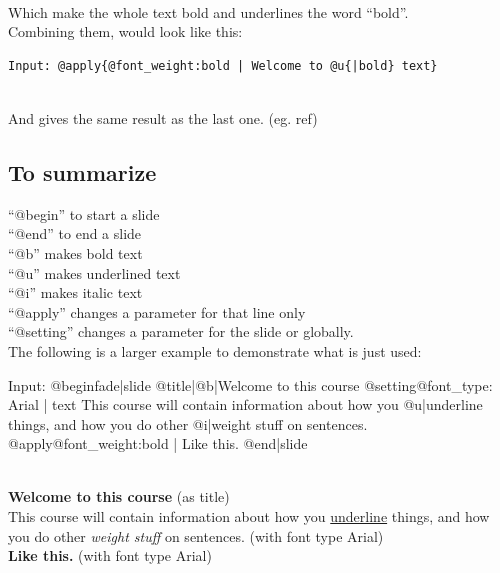  \\

Which make the whole text bold and underlines the word ``bold''.\\

Combining them, would look like this:\\

\begin{verbatim}
Input: @apply{@font_weight:bold | Welcome to @u{|bold} text}
\end{verbatim}

 \\

And gives the same result as the last one. (eg. ref)

\subsection*{To summarize}
``@begin'' to start a slide\\
``@end'' to end a slide\\
``@b'' makes bold text \\
``@u'' makes underlined text \\
``@i'' makes italic text \\
``@apply'' changes a parameter for that line only\\
``@setting'' changes a parameter for the slide or globally.\\

The following is a larger example to demonstrate what is just used:\\

\begin{spverbatim}
Input:
@begin{fade|slide}
    @title{|@b{|Welcome to this course}}
    @setting{@font_type: Arial | text}
    This course will contain information about how you @u{|underline} things, and how you do other    
    @i{|weight stuff} on sentences.
    @apply{@font_weight:bold | Like this.}
@end{|slide}
\end{spverbatim}

 \\
\textbf{Welcome to this course} (as title) \\
This course will contain information about how you \underline{underline} things, and how you do other \textit{weight stuff} on sentences. (with font type Arial) \\
\textbf{Like this.}  (with font type Arial)
\\ \\

